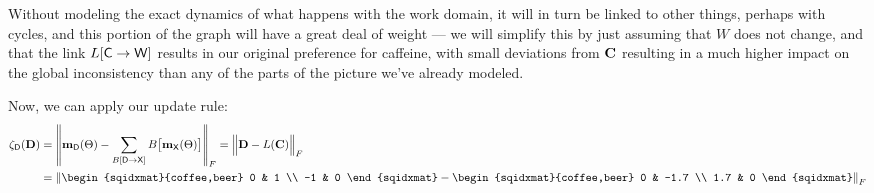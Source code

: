 \documentclass{article}
\begin{document}
	
	\begin{center}
	\end{center}\vspace{1em}
	Without modeling the exact dynamics of what happens with the work domain, it will in turn be linked to other things, perhaps with cycles, and this portion of the graph will have a great deal of weight --- we will simplify this by just assuming that $W$ does not change, and that the link $L[{\sf C \to W}]$ results in our original preference for caffeine, with small deviations from $\mathbf C$ resulting in a much higher impact on the global inconsistency than any of the parts of the picture we've already modeled.
	
	Now, we can apply our update rule:
	\begingroup\addtolength{\jot}{.8em}
	\begin{align*}
		\zeta_{\sf D}(\mat D) &= \left\lVert \m D(\Theta)  - \sum_{B[\sf D \to X]} B\big[\m X(\Theta) \big] \right\rVert_F 
		= \Big\lVert \mat D  - L(\mat C) \Big\rVert_F \\
		&= \left\lVert \begin{sqidxmat}{coffee,beer} 0 & 1 \\ -1 & 0 \end{sqidxmat}  - 
		\begin{sqidxmat}{coffee,beer} 0 & -1.7 \\ 1.7 & 0 \end{sqidxmat} \right\rVert_F \\
	\end{align*}\endgroup

	
	

	
	
	
\end{document}
